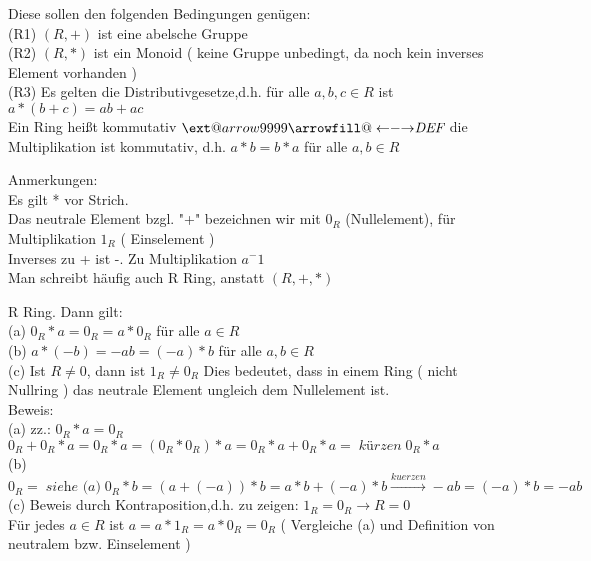 \documentclass[smallheadings,12pt,a4paper]{scrartcl}
\makeatletter
\newcommand\xleftrightarrow[2][]{%
  \ext@arrow 9999{\longleftrightarrowfill@}{#1}{#2}}
\newcommand\longleftrightarrowfill@{%
  \arrowfill@\leftarrow\relbar\rightarrow}
\makeatother
\begin{document}
Diese sollen den folgenden Bedingungen genügen: \\
(R1) $(R,+)$ ist eine abelsche Gruppe \\
(R2) $ (R,*)$ ist ein Monoid ( keine Gruppe unbedingt, da noch kein inverses Element vorhanden ) \\
(R3) Es gelten die Distributivgesetze,d.h. für alle $a,b,c \in R $ ist \\
$a*(b+c) = ab+ac $ \\

Ein Ring heißt kommutativ $\xleftrightarrow{\textit{DEF}}$ die Multiplikation ist kommutativ, d.h. $a*b = b*a $ für alle $a,b \in R $ \\

\item Anmerkungen:\\
Es gilt * vor Strich.\\
Das neutrale Element bzgl. "+" bezeichnen wir mit $0_R$ (Nullelement), für Multiplikation $1_R$ ( Einselement ) \\
Inverses zu + ist -. Zu Multiplikation $ a^-1$ \\
Man schreibt häufig auch R Ring, anstatt $(R,+,*)$  \\

\item R Ring. Dann gilt:  \\
(a) $0_R * a = 0_R = a * 0_R $ für alle $ a \in R $ \\
(b) $a*(-b) = -ab = (-a)*b$ für alle $ a,b \in R $ \\
(c) Ist $R\neq 0 $, dann ist $1_R \neq 0_R$ Dies bedeutet, dass in einem Ring ( nicht Nullring ) das neutrale Element ungleich dem Nullelement ist.\\

Beweis:\\
(a) zz.:  $0_R * a = 0_R$ \\
$0_R + 0_R * a = 0_R * a = (0_R * 0_R) * a = 0_R * a + 0_R * a = \; \textit{kürzen} \; 0_R * a $ \\
(b) $ 0_R = \; \textit{siehe (a)} \; 0_R * b = (a+(-a)) * b = a*b + (-a )*b \xrightarrow{kuerzen} -ab = (-a)*b =-ab $\\
(c) Beweis durch Kontraposition,d.h. zu zeigen: $1_R = 0_R \rightarrow R = 0 $ \\
Für jedes $ a \in R $ ist $ a = a*1_R = a*0_R = 0_R $ ( Vergleiche (a) und Definition von neutralem bzw. Einselement ) \\
\end{document}
